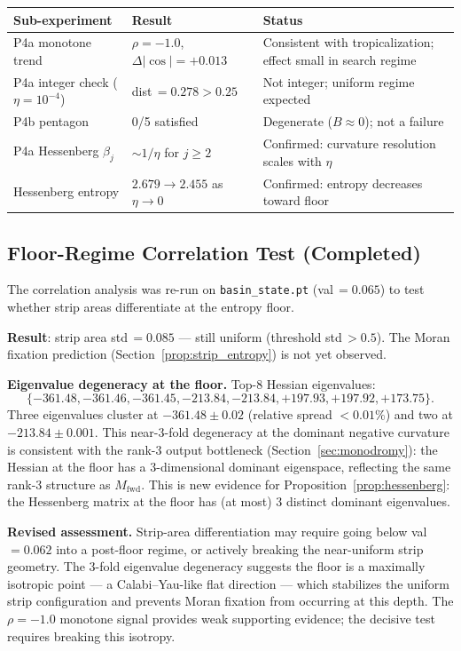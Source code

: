 \documentclass[11pt]{amsart}
\begin{document}
\begin{center}
\small
\begin{tabular}{@{}lp{3.5cm}p{4.5cm}@{}}
\toprule
Sub-experiment & Result & Status \\
\midrule
P4a monotone trend
  & $\rho = -1.0$, $\Delta|\cos| = +0.013$
  & Consistent with tropicalization; effect small in search regime \\
P4a integer check ($\eta=10^{-4}$)
  & dist\,$= 0.278 > 0.25$
  & Not integer; uniform regime expected \\
P4b pentagon
  & 0/5 satisfied
  & Degenerate ($B \approx 0$); not a failure \\
P4a Hessenberg $\beta_j$
  & $\sim 1/\eta$ for $j \geq 2$
  & Confirmed: curvature resolution scales with $\eta$ \\
Hessenberg entropy
  & $2.679 \to 2.455$ as $\eta \to 0$
  & Confirmed: entropy decreases toward floor \\
\bottomrule
\end{tabular}
\end{center}

\subsection{Floor-Regime Correlation Test (Completed)}
\label{sec:floor_correlation}

The correlation analysis was re-run on \texttt{basin\_state.pt}
(val\,$=0.065$) to test whether strip areas differentiate at the
entropy floor.

\textbf{Result}: strip area std\,$= 0.085$ --- still uniform
(threshold std\,$> 0.5$).
The Moran fixation prediction
(Section~\ref{prop:strip_entropy}) is not yet observed.

\textbf{Eigenvalue degeneracy at the floor.}
Top-8 Hessian eigenvalues:
\[
  \{-361.48, -361.46, -361.45, -213.84, -213.84,
   +197.93, +197.92, +173.75\}.
\]
Three eigenvalues cluster at $-361.48 \pm 0.02$
(relative spread $<0.01\%$) and two at $-213.84 \pm 0.001$.
This near-3-fold degeneracy at the dominant negative curvature
is consistent with the rank-3 output bottleneck
(Section~\ref{sec:monodromy}):
the Hessian at the floor has a 3-dimensional dominant eigenspace,
reflecting the same rank-3 structure as $M_\mathrm{fwd}$.
This is new evidence for Proposition~\ref{prop:hessenberg}:
the Hessenberg matrix at the floor has (at most) 3 distinct
dominant eigenvalues.

\textbf{Revised assessment.}
Strip-area differentiation may require going below
val\,$= 0.062$ into a post-floor regime, or actively
breaking the near-uniform strip geometry.
The 3-fold eigenvalue degeneracy suggests the floor is a
maximally isotropic point --- a Calabi--Yau-like flat direction
--- which stabilizes the uniform strip configuration and
prevents Moran fixation from occurring at this depth.
The $\rho = -1.0$ monotone signal provides weak supporting
evidence; the decisive test requires breaking this isotropy.
\end{document}
